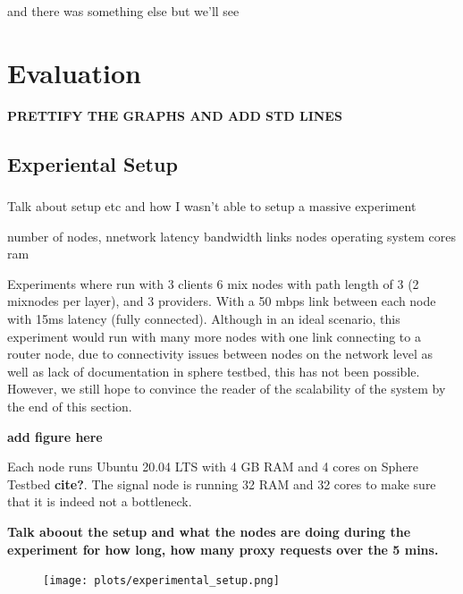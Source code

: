 \documentclass[a4paper,11pt,oneside]{report}
\begin{document}
and there was something else but we'll see

\chapter{Evaluation}



\textbf{PRETTIFY THE GRAPHS AND ADD STD LINES}
\section{Experiental Setup}
\subsection{}
Talk about setup etc and how I wasn't able to setup a massive experiment

number of nodes,
nnetwork latency bandwidth links
nodes operating system cores ram

Experiments where run with 3 clients 6 mix nodes with path length of 3 (2 mixnodes per layer), and 3 providers. With a 50 mbps link between each node with 15ms latency (fully connected). Although in an ideal scenario, this experiment would run with many more nodes with one link connecting to a router node, due to connectivity issues between nodes on the network level as well as lack of documentation in sphere testbed, this has not been possible. However, we still hope to convince the reader of the scalability of the system by the end of this section. 

\textbf{add figure here}

Each node runs Ubuntu 20.04 LTS with 4 GB RAM and 4 cores on Sphere Testbed \textbf{cite?}. The signal node is running 32 RAM and 32 cores to make sure that it is indeed not a bottleneck.


\textbf{Talk aboout the setup and what the nodes are doing during the experiment for how long, how many proxy requests over the 5 mins.}
\begin{figure}[H]
    \centering
    \texttt{[image: plots/experimental\_setup.png]}
    \caption{}
    \label{fig:setup}
\end{figure}
\end{document}
